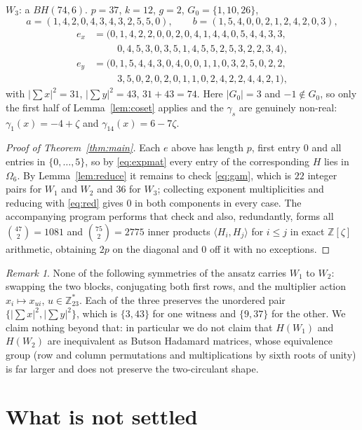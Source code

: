 \documentclass[11pt]{amsart}
\theoremstyle{remark}
\newtheorem*{remark}{Remark}
\newcommand{\zzz}{\zeta}
\newcommand{\Om}{\Omega}
\begin{document}
\medskip
\noindent$W_3$: a $BH(74,6)$. $p=37$, $k=12$, $g=2$, $G_0=\{1,10,26\}$,
\[
 a=(1,4,2,0,4,3,4,3,2,5,5,0),\qquad b=(1,5,4,0,0,2,1,2,4,2,0,3),
\]
\[
\begin{aligned}
 e_x&=(0,1,4,2,2,0,0,2,0,4,1,4,4,0,5,4,4,3,3,\\
     &\qquad\ \ 0,4,5,3,0,3,5,1,4,5,5,2,5,3,2,2,3,4),\\
 e_y&=(0,1,5,4,4,3,0,4,0,0,1,1,0,3,2,5,0,2,2,\\
     &\qquad\ \ 3,5,0,2,0,2,0,1,1,0,2,4,2,2,4,4,2,1),
\end{aligned}
\]
with $|\sum x|^{2}=31$, $|\sum y|^{2}=43$, $31+43=74$. Here $|G_0|=3$ and
$-1\notin G_0$, so only the first half of Lemma~\ref{lem:coset} applies and
the $\gamma_s$ are genuinely non-real: $\gamma_1(x)=-4+\zzz$ and
$\gamma_{14}(x)=6-7\zzz$.

\begin{proof}[Proof of Theorem~\ref{thm:main}]
Each $e$ above has length $p$, first entry $0$ and all entries in
$\{0,\ldots,5\}$, so by \eqref{eq:expmat} every entry of the corresponding
$H$ lies in $\Om_6$. By Lemma~\ref{lem:reduce} it remains to check
\eqref{eq:gam}, which is $22$ integer pairs for $W_1$ and $W_2$ and $36$ for
$W_3$; collecting exponent multiplicities and reducing with \eqref{eq:red}
gives $0$ in both components in every case. The accompanying program
performs that check and also, redundantly, forms all
$\binom{47}{2}=1081$ and $\binom{75}{2}=2775$ inner products
$\langle H_i,H_j\rangle$ for $i\le j$ in exact $\mathbb Z[\zzz]$ arithmetic,
obtaining $2p$ on the diagonal and $0$ off it with no exceptions.
\end{proof}

\begin{remark}
None of the following symmetries of the ansatz carries $W_1$ to $W_2$:
swapping the two blocks, conjugating both first rows, and the multiplier
action $x_i\mapsto x_{ui}$, $u\in\mathbb Z_{23}^{*}$. Each of the three
preserves the unordered pair $\{|\sum x|^{2},|\sum y|^{2}\}$, which is
$\{3,43\}$ for one witness and $\{9,37\}$ for the other. We claim nothing
beyond that: in particular we do not claim that $H(W_1)$ and $H(W_2)$ are
inequivalent as Butson Hadamard matrices, whose equivalence group (row and
column permutations and multiplications by sixth roots of unity) is far
larger and does not preserve the two-circulant shape.
\end{remark}

\section{What is not settled}
\end{document}
